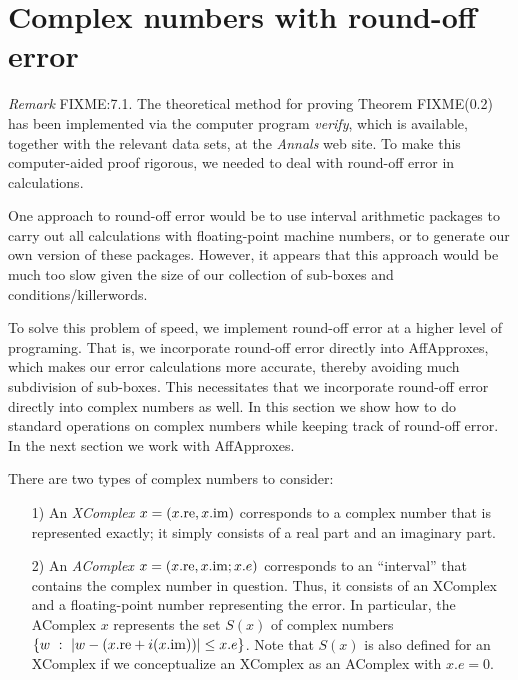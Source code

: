 \section{Complex numbers with round-off error}


{\it Remark} FIXME:7.1.
The theoretical method for proving Theorem FIXME(0.2)
has been implemented via the computer program {\it verify}, which is available, together with the relevant data sets, at the {\it Annals} web site.  To make this computer-aided proof rigorous, we needed to deal with round-off error in calculations.  

One approach to round-off error would be to use interval arithmetic packages to carry out all calculations with floating-point machine numbers, or to generate our own version of these packages.  
However, it appears that this approach
would be much too slow given the size of our collection of sub-boxes and conditions/killerwords.  

To solve this problem of speed, we implement round-off error at a higher level of programing.  That is, we incorporate round-off error directly
 into AffApproxes,  which makes our error calculations more accurate, thereby avoiding much subdivision of
sub-boxes. This necessitates that we incorporate round-off error directly into complex numbers as well. 
In this section we show how to do standard operations on complex numbers while keeping track of round-off error.
In the next section we work with  AffApproxes.

There are two types of complex numbers to consider: 

\begin{itemize}
\item[1)]  An {\it XComplex} $x = (x.{\rm re}, x.{\rm im})$ corresponds to a complex number that is represented exactly; it
simply consists of a real part and an imaginary part.

\item[2)]  An {\it AComplex} $x = (x.{\rm re}, x.{\rm im}; x.e)$ corresponds to an ``interval'' that contains the complex number in
question.  Thus, it consists of an XComplex and a floating-point number representing the error.  In particular, the AComplex
$x$ represents the set $S(x)$ of complex numbers 
$\{w\ :\ |w - (x.{\rm re} + i (x.{\rm im}))| \le x.e\}$.  Note that $S(x)$ is also defined
for an XComplex if we conceptualize an XComplex as an AComplex with
$x.e = 0.$
\end{itemize}

